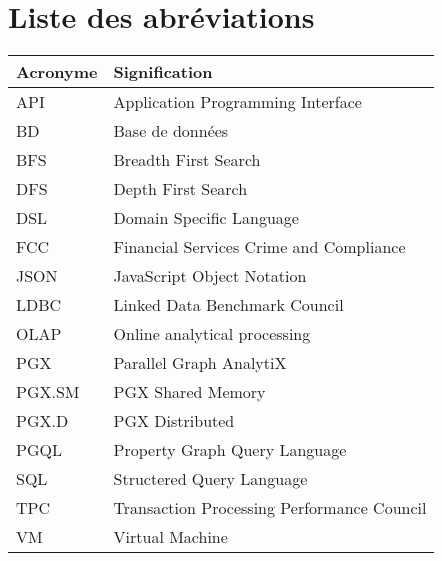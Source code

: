 \chapter*{Liste des abréviations}

\renewcommand{\arraystretch}{1.15}
\begin{table}[ht]
\begin{center}
\begin{tabular}{p{4cm}p{9cm}}
  \hline
Acronyme & Signification \\
  \hline
API & Application Programming Interface \\
BD & Base de données \\
BFS & Breadth First Search \\
DFS & Depth First Search \\
DSL & Domain Specific Language \\
FCC & Financial Services Crime and Compliance\\
JSON & JavaScript Object Notation \\
LDBC & Linked Data Benchmark Council \\
OLAP & Online analytical processing \\
PGX & Parallel Graph AnalytiX \\
PGX.SM & PGX Shared Memory \\
PGX.D & PGX Distributed \\
PGQL & Property Graph Query Language \\
SQL & Structered Query Language \\
TPC & Transaction Processing Performance Council \\
VM & Virtual Machine \\
  \hline
\end{tabular}

\end{center}
\end{table}
\renewcommand{\arraystretch}{1}
